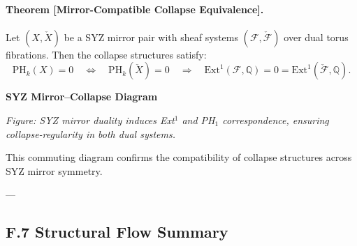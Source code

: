 \documentclass[11pt]{article}
\begin{document}
\paragraph{Theorem [Mirror-Compatible Collapse Equivalence].}
Let $(X, \check{X})$ be a SYZ mirror pair with sheaf systems $(\mathcal{F}, \check{\mathcal{F}})$ over dual torus fibrations.  
Then the collapse structures satisfy:
\[
\mathrm{PH}_k(X) = 0 \quad \Leftrightarrow \quad \mathrm{PH}_k(\check{X}) = 0
\quad \Rightarrow \quad
\mathrm{Ext}^1(\mathcal{F}, \mathbb{Q}) = 0 = \mathrm{Ext}^1(\check{\mathcal{F}}, \mathbb{Q}).
\]

\vspace{1.5em}
\noindent\textbf{SYZ Mirror–Collapse Diagram}

\vspace{0.5em}
\noindent
\begin{minipage}{\textwidth}
\centering
{}
\vspace{0.5em}

\small\textit{Figure: SYZ mirror duality induces Ext$^1$ and PH$_1$ correspondence, ensuring collapse-regularity in both dual systems.}
\end{minipage}

This commuting diagram confirms the compatibility of collapse structures across SYZ mirror symmetry.

---

\subsection*{F.7 Structural Flow Summary}

\begin{center}
\end{center}
\end{document}
